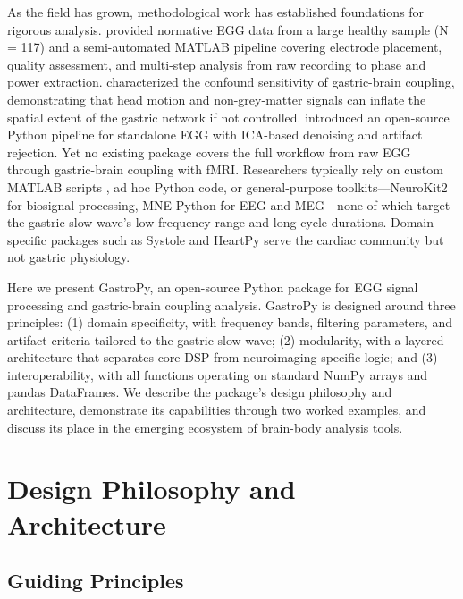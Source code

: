 \documentclass[12pt]{article}
\begin{document}
As the field has grown, methodological work has established foundations for
rigorous analysis. \citet{Wolpert2020} provided normative EGG data from a
large healthy sample (N = 117) and a semi-automated MATLAB pipeline covering
electrode placement, quality assessment, and multi-step analysis from raw
recording to phase and power extraction. \citet{Levakov2023} characterized the
confound sensitivity of gastric-brain coupling, demonstrating that head motion
and non-grey-matter signals can inflate the spatial extent of the gastric
network if not controlled. \citet{Anisimova2025} introduced an open-source
Python pipeline for standalone EGG with ICA-based denoising and artifact
rejection. Yet no existing package covers the full workflow from raw EGG
through gastric-brain coupling with fMRI. Researchers typically rely on custom
MATLAB scripts \citep{Wolpert2020, Banellis2025}, ad hoc Python code, or
general-purpose toolkits---NeuroKit2 \citep{Makowski2021} for biosignal
processing, MNE-Python \citep{Gramfort2013} for EEG and MEG---none of which
target the gastric slow wave's low frequency range and long cycle durations.
Domain-specific packages such as Systole \citep{Legrand2020} and HeartPy
\citep{vanGent2019} serve the cardiac community but not gastric physiology.

Here we present GastroPy, an open-source Python package for EGG signal
processing and gastric-brain coupling analysis. GastroPy is designed around
three principles: (1) domain specificity, with frequency bands, filtering
parameters, and artifact criteria tailored to the gastric slow wave;
(2) modularity, with a layered architecture that separates core DSP from
neuroimaging-specific logic; and (3) interoperability, with all functions
operating on standard NumPy arrays and pandas DataFrames. We describe the
package's design philosophy and architecture, demonstrate its capabilities
through two worked examples, and discuss its place in the emerging ecosystem
of brain-body analysis tools.

\section{Design Philosophy and Architecture}

\subsection{Guiding Principles}
\end{document}
